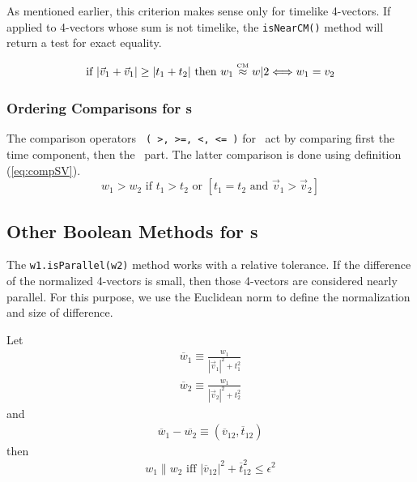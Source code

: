 As mentioned earlier, this criterion makes sense only for timelike 4-vectors.
If applied to 4-vectors whose sum is not timelike, the {\tt isNearCM()}
method will return a test for exact equality.

\begin{eqnarray}
\label{eq:wisNearCM:2}
  \mbox{if  } | \vec{v}_1 + \vec{v}_1 | \geq | t_1 + t_2 | \mbox{ then  }
w_1 \stackrel{\mbox{\tiny CM}}{\approx} w|2 \Longleftrightarrow w_1 = v_2
\end{eqnarray}

\subsubsection{Ordering Comparisons for \protect\LV s}

The comparison operators \verb$ ( >, >=, <, <= )$ for \LV\ act by comparing
first the time component, then the \SV\ part. The latter comparison is done
using definition (\ref{eq:compSV}).
\begin{equation}
\label{eq:wcomp}
  w_1 > w_2 \mbox{ if }
	t_1 > t_2 \mbox { or } \left[
	t_1 = t_2 \mbox { and }
	\vec{v}_1 > \vec{v}_2 \right]
\end{equation}

\subsection{Other Boolean Methods for \protect\LV s}

The {\tt w1.isParallel(w2)} method works with a relative tolerance.
If the difference of the normalized 4-vectors is small,
then those 4-vectors are considered nearly parallel.
For this purpose, we use the Euclidean norm to define the normalization and
size of difference.

Let
\begin{eqnarray}
  \overline{w}_1 \equiv \frac{w_1}{|\vec{v}_1|^2 + t_1^2} \nonumber \\
  \overline{w}_2 \equiv \frac{w_1}{|\vec{v}_2|^2 + t_2^2} \nonumber
\end{eqnarray}
\noindent
and
\begin{eqnarray}
  \overline{w}_1 - \overline{w_2} \equiv
  ( \overline{v}_{12} , \overline{t}_{12} ) \nonumber
\end{eqnarray}
\noindent
then
\begin{equation}
\label{eq:wisPar}
  w_1 \parallel w_2 \mbox{ iff }
  \left| \overline{v}_{12} \right| ^2 + \overline{t}_{12}^2 \leq \epsilon^2
\end{equation}

